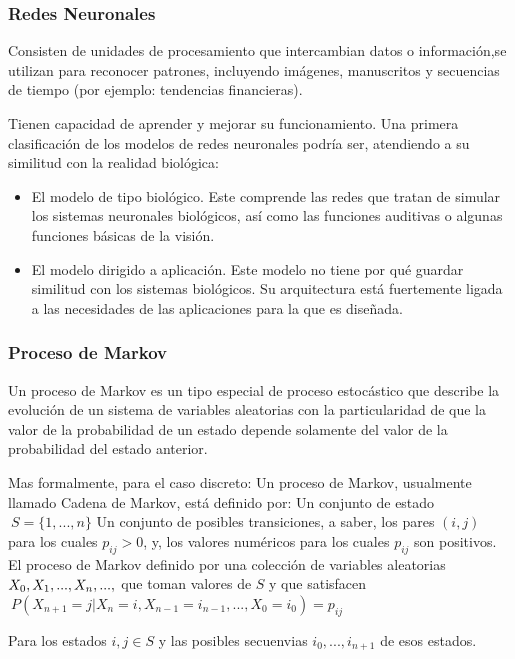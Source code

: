 \documentclass[a4paper]{article}
\begin{document}
\subsubsection*{Redes Neuronales}
Consisten de unidades de procesamiento que intercambian datos o
información,se utilizan para reconocer patrones, incluyendo imágenes, manuscritos y
secuencias de tiempo (por ejemplo: tendencias financieras).

Tienen capacidad de aprender y mejorar su funcionamiento. Una primera clasificación de los modelos de redes neuronales podría ser,
atendiendo a su similitud con la realidad biológica:
\begin{itemize}
\item El modelo de tipo biológico. Este comprende las redes que tratan de simular los sistemas neuronales biológicos, así como las funciones auditivas o algunas funciones básicas de la visión.
\item El modelo dirigido a aplicación. Este modelo no tiene por qué guardar similitud con los sistemas biológicos. Su arquitectura está fuertemente ligada a las necesidades de las aplicaciones para la que es diseñada.

\end{itemize}

\subsubsection{Proceso de Markov}
Un proceso de Markov es un tipo especial de proceso estocástico que describe la evolución de un sistema de variables aleatorias con la particularidad de que la valor de la probabilidad de un estado depende solamente del valor de la probabilidad del estado anterior.

Mas formalmente, para el caso discreto:
Un proceso de Markov, usualmente llamado Cadena de Markov, está definido por:
Un conjunto de estado $\ S = \{1,..., n\}$
Un conjunto de posibles transiciones, a saber, los pares $(i, j)$ para los cuales $p_{ij} > 0$, y, los valores numéricos para los cuales $p_{ij}$ son positivos.\\
El proceso de Markov definido por una colección de variables aleatorias $X_{0},\\
X_{1},...,X_{n},...,$ que toman valores de $S$ y que satisfacen $\ P(X_{n+1} = j | X_{n} = i, X_{n-1} = i_{n-1},..., X_{0} = i_{0}) = p_{ij}$

Para los estados $i,j \in S$ y las posibles secuenvias $i_{0},..., i_{n+1}$ de esos estados.
\end{document}

